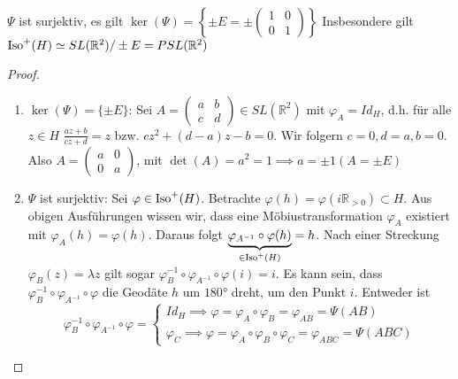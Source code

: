 \documentclass[../main.tex]{subfiles}
\begin{document}
\begin{theorem}
    $\Psi$ ist surjektiv, es gilt $\ker (\Psi) = \left \{ \pm  E = \pm  \begin{pmatrix}
        1 & 0 \\ 0 & 1
    \end{pmatrix} \right \}$
    Insbesondere gilt $\operatorname{Iso} ^+ (H) \simeq SL(\mathbb{R}^2) / \pm E = PSL(\mathbb{R}^2)$
\end{theorem}

\begin{proof}
    \leavevmode
    \begin{enumerate}
        \item $\ker (\Psi) = \{ \pm E\}$: Sei $A = \begin{pmatrix}
            a & b \\ c & d
        \end{pmatrix} \in SL(\mathbb{R}^2)$ mit $\varphi _A = Id_H$,
        d.h. für alle $z \in H$
        $\frac{az+b}{cz+d}=z$ bzw. $cz^2 + (d-a)z -b=0$.
        Wir folgern $c=0, d=a, b = 0$. Also $A = \begin{pmatrix}
            a & 0 \\ 0 & a
        \end{pmatrix}$, mit $\det (A) = a^2 = 1 \implies a = \pm 1 (A = \pm E)$ 

        \item $\Psi $ ist surjektiv: Sei $\varphi \in \operatorname{Iso} ^+ (H)$. Betrachte
        $\varphi (h) = \varphi (i \mathbb{R}_{>0}) \subset H$. Aus obigen Ausführungen wissen wir,
        dass eine Möbiustransformation $\varphi _A$ existiert mit $\varphi _A (h)=\varphi(h)$.
        Daraus folgt $\underbrace{\varphi _{A^{-1}} \circ \varphi (h)}_{\in \operatorname{Iso} ^+(H)} = h$.
        Nach einer Streckung $\varphi _B(z)=\lambda z$ gilt sogar $\varphi _B^{-1} \circ \varphi _{A^{-1}} \circ \varphi (i) =i$.
        Es kann sein, dass $\varphi _B^{-1} \circ \varphi _{A^{-1}} \circ \varphi$ die Geodäte $h$ um
        $180$° dreht, um den Punkt $i$.
        Entweder ist
        $$\varphi _B^{-1} \circ \varphi _{A^{-1}} \circ \varphi = \begin{cases}
            Id _H \implies \varphi = \varphi _A \circ \varphi _B = \varphi _{AB} = \Psi (AB) \\
            \varphi _{C} \implies \varphi = \varphi _A \circ \varphi _B \circ \varphi _C = \varphi _{ABC}=\Psi (ABC)
        \end{cases}$$
    \end{enumerate}
\end{proof}
\end{document}
